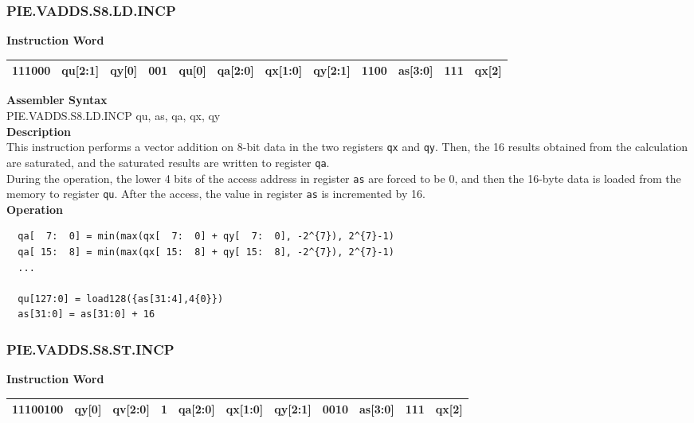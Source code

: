 \newpage
\subsubsection{PIE.VADDS.S8.LD.INCP}\label{instruction:PIEVADDSS8LDINCP}
\setlength\tabcolsep{6pt}
\textbf{Instruction Word} \\
\begin{tabular}{|c|c|c|c|c|c|c|c|c|c|c|c|}
	\hline
	111000 & qu[2:1] & qy[0] & 001 & qu[0] & qa[2:0] & qx[1:0] & qy[2:1] & 1100 & as[3:0] & 111 & qx[2] \\
	\hline
\end{tabular}

\textbf{Assembler Syntax} \\
PIE.VADDS.S8.LD.INCP qu, as, qa, qx, qy \\
\textbf{Description} \\
This instruction performs a vector addition on 8-bit data in the two registers \lstinline{qx} and \lstinline{qy}. Then, the 16 results obtained from the calculation are saturated, and the saturated results are written to register \lstinline{qa}. \\ During the operation, the lower 4 bits of the access address in register \lstinline{as} are forced to be 0, and then the 16-byte data is loaded from the memory to register \lstinline{qu}. After the access, the value in register \lstinline{as} is incremented by 16.\\
\textbf{Operation}
\begin{lstlisting}
  qa[  7:  0] = min(max(qx[  7:  0] + qy[  7:  0], -2^{7}), 2^{7}-1)
  qa[ 15:  8] = min(max(qx[ 15:  8] + qy[ 15:  8], -2^{7}), 2^{7}-1)
  ...

  qu[127:0] = load128({as[31:4],4{0}})
  as[31:0] = as[31:0] + 16
\end{lstlisting}

\newpage
\subsubsection{PIE.VADDS.S8.ST.INCP}\label{instruction:PIEVADDSS8STINCP}
\setlength\tabcolsep{6pt}
\textbf{Instruction Word} \\
\begin{tabular}{|c|c|c|c|c|c|c|c|c|c|c|}
	\hline
	11100100 & qy[0] & qv[2:0] & 1 & qa[2:0] & qx[1:0] & qy[2:1] & 0010 & as[3:0] & 111 & qx[2] \\
	\hline
\end{tabular}

